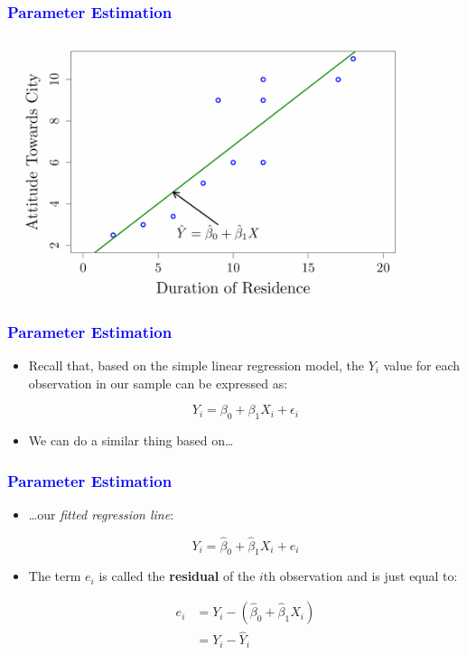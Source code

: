 \documentclass[12pt]{beamer}
\begin{document}
\begin{frame}
	\frametitle{\textcolor{blue}{Parameter Estimation}}
	\centering
	\includegraphics[width=12cm]{para2.png}
\end{frame}
\begin{frame}
	\frametitle{\textcolor{blue}{Parameter Estimation}}
	
	\begin{itemize}[label={\color{blue}$\blacktriangleright$}]
		\item Recall that, based on the simple linear regression model, the $Y_i$ value for each observation in our sample can be expressed as:
		
		\[
		Y_i = \beta_0 + \beta_1X_i + \epsilon_i
		\]
		
		\item We can do a similar thing based on\ldots
	\end{itemize}
	
\end{frame}
\begin{frame}
	\frametitle{\textcolor{blue}{Parameter Estimation}}
	
	\begin{itemize}[label={\color{blue}$\blacktriangleright$}]
		\item \ldots our \textit{fitted regression line}:
		
		\[
		Y_i = \hat{\beta}_0 + \hat{\beta}_1X_i + e_i
		\]
		
		\item The term $e_i$ is called the \textbf{residual} of the $i$th observation and is just equal to:
		
		\begin{align*}
			e_i &= Y_i - (\hat{\beta}_0 + \hat{\beta}_1X_i) \\
			&= Y_i - \hat{Y}_i
		\end{align*}
	\end{itemize}
	
\end{frame}
\end{document}
